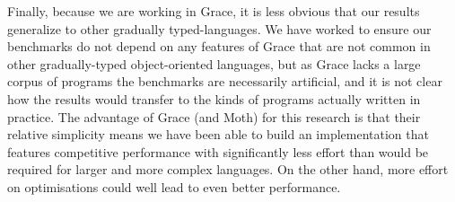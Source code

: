 Finally, because we are working in Grace, it is less obvious that our
results generalize to other gradually typed-languages. We have worked
to ensure \eg our benchmarks do not depend on any features of Grace
that are not common in other gradually-typed object-oriented
languages, but as Grace lacks a large corpus of programs the
benchmarks are necessarily artificial, and it is not clear how the
results would transfer to the kinds of programs actually written in
practice. The advantage of Grace (and Moth) for this research is
that their relative simplicity means we have been able to build an
implementation that features competitive performance with significantly less
effort than would be required for larger and more complex languages.
On the other hand, more effort on optimisations could well lead to
even better performance.
